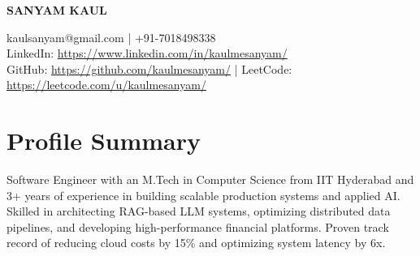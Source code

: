 \documentclass[10pt,a4paper]{article}
\begin{document}
\begin{center}
    {\Huge\bfseries SANYAM KAUL} \\ \vspace{4pt}
    
    \small
    kaulsanyam@gmail.com \quad | \quad +91-7018498338 \\
    LinkedIn: \href{https://www.linkedin.com/in/kaulmesanyam/}{https://www.linkedin.com/in/kaulmesanyam/} \\
    GitHub: \href{https://github.com/kaulmesanyam/}{https://github.com/kaulmesanyam/} \quad | \quad LeetCode: \href{https://leetcode.com/u/kaulmesanyam/}{https://leetcode.com/u/kaulmesanyam/}
\end{center}

\vspace{-4pt}
\section{Profile Summary}
\small
Software Engineer with an M.Tech in Computer Science from IIT Hyderabad and 3+ years of experience in building scalable production systems and applied AI. Skilled in architecting RAG-based LLM systems, optimizing distributed data pipelines, and developing high-performance financial platforms. Proven track record of reducing cloud costs by 15\% and optimizing system latency by 6x.

\vspace{6pt}
\end{document}
